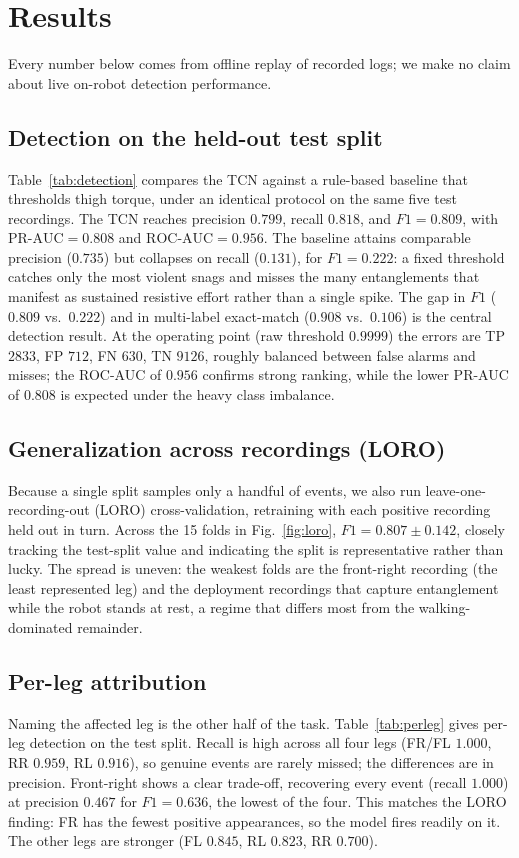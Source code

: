 \section{Results}

Every number below comes from offline replay of recorded logs; we make no claim about live on-robot detection performance.

\subsection{Detection on the held-out test split}
Table~\ref{tab:detection} compares the TCN against a rule-based baseline that thresholds thigh torque, under an identical protocol on the same five test recordings. The TCN reaches precision $0.799$, recall $0.818$, and $F1 = 0.809$, with $\text{PR-AUC} = 0.808$ and $\text{ROC-AUC} = 0.956$. The baseline attains comparable precision ($0.735$) but collapses on recall ($0.131$), for $F1 = 0.222$: a fixed threshold catches only the most violent snags and misses the many entanglements that manifest as sustained resistive effort rather than a single spike. The gap in $F1$ ($0.809$ vs.\ $0.222$) and in multi-label exact-match ($0.908$ vs.\ $0.106$) is the central detection result. At the operating point (raw threshold $0.9999$) the errors are TP $2833$, FP $712$, FN $630$, TN $9126$, roughly balanced between false alarms and misses; the ROC-AUC of $0.956$ confirms strong ranking, while the lower PR-AUC of $0.808$ is expected under the heavy class imbalance.

\subsection{Generalization across recordings (LORO)}
Because a single split samples only a handful of events, we also run leave-one-recording-out (LORO) cross-validation, retraining with each positive recording held out in turn. Across the 15 folds in Fig.~\ref{fig:loro}, $F1 = 0.807 \pm 0.142$, closely tracking the test-split value and indicating the split is representative rather than lucky. The spread is uneven: the weakest folds are the front-right recording (the least represented leg) and the deployment recordings that capture entanglement while the robot stands at rest, a regime that differs most from the walking-dominated remainder.

\subsection{Per-leg attribution}
Naming the affected leg is the other half of the task. Table~\ref{tab:perleg} gives per-leg detection on the test split. Recall is high across all four legs (FR/FL $1.000$, RR $0.959$, RL $0.916$), so genuine events are rarely missed; the differences are in precision. Front-right shows a clear trade-off, recovering every event (recall $1.000$) at precision $0.467$ for $F1 = 0.636$, the lowest of the four. This matches the LORO finding: FR has the fewest positive appearances, so the model fires readily on it. The other legs are stronger (FL $0.845$, RL $0.823$, RR $0.700$).


